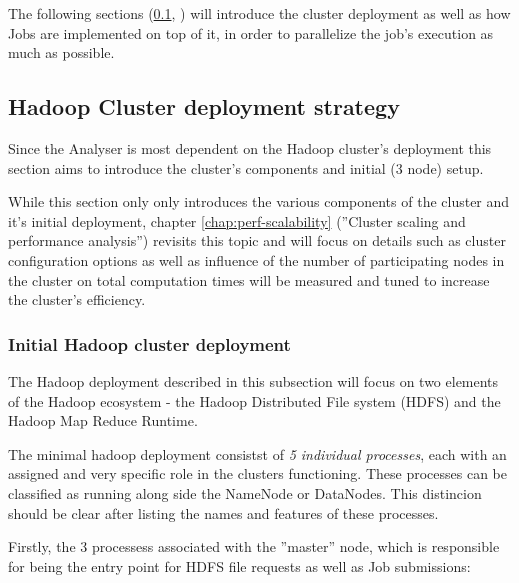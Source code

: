 The following sections (\ref{sec:deployment-strategy}, \label{sec:defining-pipelines-basics}) will introduce the cluster deployment as well as how Jobs are implemented on top of it, in order to parallelize the job's execution as much as possible.



\subsection{Hadoop Cluster deployment strategy}
\label{sec:deployment-strategy}

Since the Analyser is most dependent on the Hadoop cluster's deployment this section aims to introduce the cluster's components and initial (3 node) setup. 

While this section only only introduces the various components of the cluster and it's initial deployment, chapter \ref{chap:perf-scalability} (''Cluster scaling and performance analysis'') revisits this topic and will focus on details such as cluster configuration options as well as influence of the number of participating nodes in the cluster on total computation times will be measured and tuned to increase the cluster's efficiency.

\subsubsection{Initial Hadoop cluster deployment}

The Hadoop deployment described in this subsection will focus on two elements of the Hadoop ecosystem - the Hadoop Distributed File system (HDFS) and the Hadoop Map Reduce Runtime.

The minimal hadoop deployment consistst of \textit{5 individual processes}, each with an assigned and very specific role in the clusters functioning. These processes can be classified as running along side the NameNode or DataNodes. This distincion should be clear after listing the names and features of these processes.

Firstly, the 3 processess associated with the ''master'' node, which is responsible for being the entry point for HDFS file requests as well as Job submissions:

